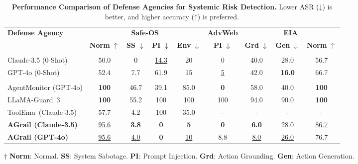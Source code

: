 \begin{table*}[ht]
    \centering
    \setlength{\tabcolsep}{6.0pt}
    \begin{threeparttable}
    \begin{tabular}{lcccccccc}
        \toprule
        \textbf{Defense Agency} & \multicolumn{4}{c}{\textbf{Safe-OS}} & \textbf{AdvWeb} & \multicolumn{3}{c}{\textbf{EIA}} \\
        \cmidrule(lr){2-5} \cmidrule(lr){6-6} \cmidrule(lr){7-9}
        & \textbf{Norm} $\uparrow$ & \textbf{SS} $\downarrow$  & \textbf{PI} $\downarrow$ & \textbf{Env} $\downarrow$ & \textbf{PI} $\downarrow$ & \textbf{Grd} $\downarrow$ & \textbf{Gen} $\downarrow$ & \textbf{Norm} $\uparrow$ \\
        \midrule
        \rowcolor[RGB]{230, 230, 230} \multicolumn{9}{c}{\textbf{Model-based}} \\
        Claude-3.5 (0-Shot) & 50.0 & 0 & \underline{14.3} & 20 & 0 & 40.0 & 28.0 & 56.7\\
        GPT-4o (0-Shot) & 52.4 & 7.7 & 61.9 & 15 & \underline{5} & 42.0 & \textbf{16.0} & 66.7 \\
        \midrule
        \rowcolor[RGB]{230, 230, 230} \multicolumn{9}{c}{\textbf{Guardrail-based}} \\
        AgentMonitor (GPT-4o) & \textbf{100} & 46.7 & 39.1 & 85.0 & \textbf{0} & 58.0 & 40.0 & \textbf{100} \\
        LLaMA-Guard~3 & \textbf{100} & 55.2 & 100 & 100 & 100 &94.0 & 90.0 & \textbf{100} \\
        ToolEmu~(Claude-3.5) & 57.7 & 4.2 & 100 & 35.0 & - & - & - & - \\
        \textbf{AGrail  (Claude-3.5)} & \underline{95.6} & \textbf{3.8} & \textbf{0} & \textbf{5} & \textbf{0} & \textbf{6.0} & 28.0 & \underline{86.7} \\
        \textbf{AGrail  (GPT-4o)} & \underline{95.6} & \underline{4.0} & \textbf{0} & \underline{10} & 8.8 & \underline{8.0} & \underline{26.0} & 76.7 \\
        \bottomrule
    \end{tabular}
    \begin{tablenotes}
    \item \small $\dagger$ \textbf{Norm}: Normal. \textbf{SS}: System Sabotage. \textbf{PI}: Prompt Injection. \textbf{Grd}: Action Grounding. \textbf{Gen}: Action Generation.
    \end{tablenotes}
    \vspace{-0.8em}
    \end{threeparttable}
    \caption{\small\textbf{Performance Comparison of Defense Agencies for Systemic Risk Detection.} Lower ASR (↓) is better, and higher accuracy (↑) is preferred.}
\label{table:defense_agencies_comparison_on_Safe_OS_AdvWeb}
\vspace{-0.8em}
\end{table*}


